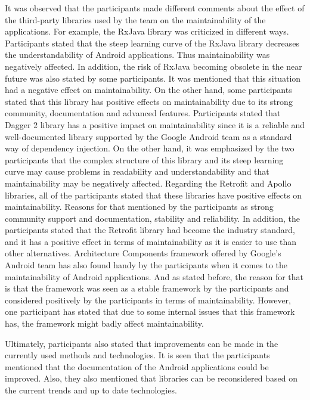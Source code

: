 It was observed that the participants made different comments about the effect of the third-party libraries used by the team on the maintainability of the applications. For example, the RxJava library was criticized in different ways. Participants stated that the steep learning curve of the RxJava library decreases the understandability of Android applications. Thus maintainability was negatively affected. In addition, the risk of RxJava becoming obsolete in the near future was also stated by some participants. It was mentioned that this situation had a negative effect on maintainability. On the other hand, some participants stated that this library has positive effects on maintainability due to its strong community, documentation and advanced features. Participants stated that Dagger 2 library has a positive impact on maintainability since it is a reliable and well-documented library supported by the Google Android team as a standard way of dependency injection. On the other hand, it was emphasized by the two participants that the complex structure of this library and its steep learning curve may cause problems in readability and understandability and that maintainability may be negatively affected. Regarding the Retrofit and Apollo libraries, all of the participants stated that these libraries have positive effects on maintainability. Reasons for that mentioned by the participants as strong community support and documentation, stability and reliability. In addition, the participants stated that the Retrofit library had become the industry standard, and it has a positive effect in terms of maintainability as it is easier to use than other alternatives. Architecture Components framework offered by Google's Android team has also found handy by the participants when it comes to the maintainability of Android applications. And as stated before, the reason for that is that the framework was seen as a stable framework by the participants and considered positively by the participants in terms of maintainability. However, one participant has stated that due to some internal issues that this framework has, the framework might badly affect maintainability. 

Ultimately, participants also stated that improvements can be made in the currently used methods and technologies. It is seen that the participants mentioned that the documentation of the Android applications could be improved. Also, they also mentioned that libraries can be reconsidered based on the current trends and up to date technologies.